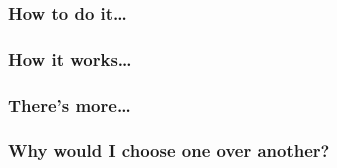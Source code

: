 

\subsubsection{How to do it…}


\subsubsection{How it works…}

\subsubsection{There's more…}


\subsubsection{Why would I choose one over another?}